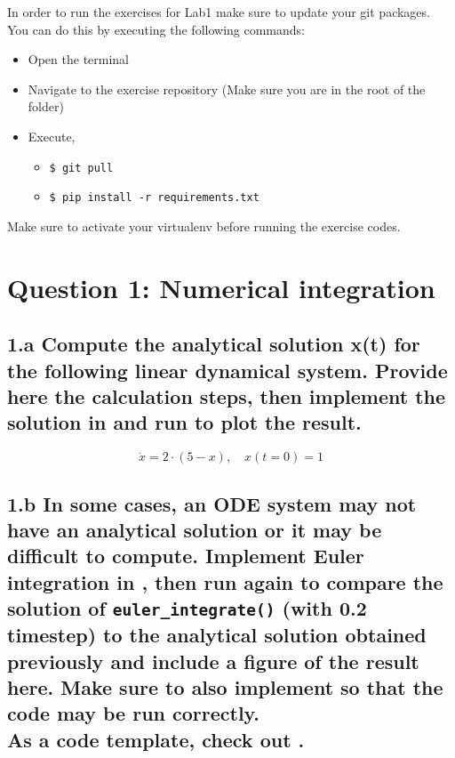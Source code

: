 \documentclass{cmc}
\begin{document}
In order to run the exercises for Lab1 make sure to update your git packages.
You can do this by executing the following commands:

\begin{itemize}
\item Open the terminal
\item Navigate to the exercise repository (Make sure you are in the
  root of the folder)
\item Execute,
  \begin{itemize}
  \item \lstinline[columns=fixed]{$ git pull}
  \item \lstinline[columns=fixed]{$ pip install -r requirements.txt}
  \end{itemize}
\end{itemize}


 Make sure to activate your virtualenv before running the exercise
codes.

\newpage
\section*{Question 1: Numerical integration}

\subsection*{1.a Compute the analytical solution x(t) %
  for the following linear dynamical system. Provide here the calculation steps,
  then implement the solution in
  and run  to plot the result.}

\begin{equation}
  \label{eq:ode-1}
  \dot{x} = 2 \cdot (5 - x), \quad x(t=0)=1
\end{equation}


\vspace{0.3\textheight}


\newpage
\subsection*{1.b In some cases, an ODE system may not have an analytical
  solution or it may be difficult to compute. Implement Euler integration in
  , %
  then run  again to compare the solution of
  \texttt{eu\-ler\_integr\-ate()} (with 0.2 timestep) %
  to the analytical solution obtained previously and include a figure of the
  result here. Make sure to also implement
  so that the code may be run correctly. \\ As a code template, check out
  .}
\end{document}
